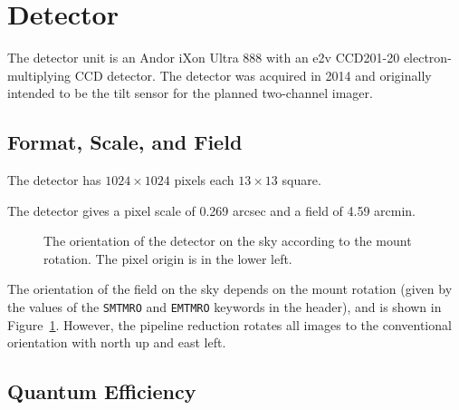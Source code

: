 \section{Detector}

The detector unit is an Andor iXon Ultra 888 with an e2v CCD201-20 electron-multiplying CCD detector. The detector was acquired in 2014 and originally intended to be the tilt sensor for the planned two-channel imager.

\subsection{Format, Scale, and Field}

The detector has $1024\times1024$ pixels each $13\times13$ {\micron} square. 

The detector gives a pixel scale of 0.269 arcsec and a field of 4.59 arcmin. 

\begin{figure}
\begin{center}
\end{center}
\caption{The orientation of the detector on the sky according to the mount rotation. The pixel origin is in the lower left.}
\label{figure:huitzi-f20-detector-orientation}
\end{figure}

The orientation of the field on the sky depends on the mount rotation (given by the values of the \verb|SMTMRO| and \verb|EMTMRO| keywords in the header), and is shown in Figure~\ref{figure:huitzi-f20-detector-orientation}. However, the pipeline reduction rotates all images to the conventional orientation with north up and east left.

\subsection{Quantum Efficiency}

